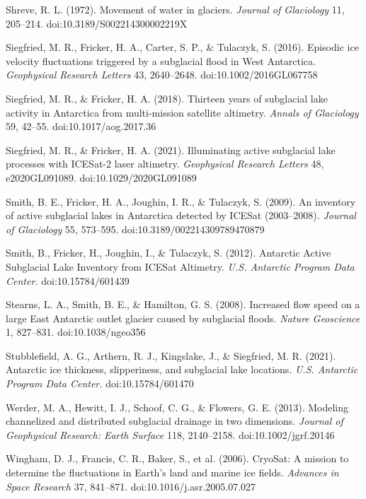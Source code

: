 \documentclass[tc, manuscript]{copernicus}
\begin{document}
\begin{thebibliography}{}
Shreve, R. L. (1972). Movement of water in glaciers. \emph{Journal of Glaciology} 11, 205–214. doi:10.3189/S002214300002219X

Siegfried, M. R., Fricker, H. A., Carter, S. P., \& Tulaczyk, S. (2016). Episodic ice velocity fluctuations triggered by a subglacial flood in West Antarctica. \emph{Geophysical Research Letters} 43, 2640–2648. doi:10.1002/2016GL067758

Siegfried, M. R., \& Fricker, H. A. (2018). Thirteen years of subglacial lake activity in Antarctica from multi-mission satellite altimetry. \emph{Annals of Glaciology} 59, 42–55. doi:10.1017/aog.2017.36

Siegfried, M. R., \& Fricker, H. A. (2021). Illuminating active subglacial lake processes with ICESat-2 laser altimetry. \emph{Geophysical Research Letters} 48, e2020GL091089. doi:10.1029/2020GL091089

Smith, B. E., Fricker, H. A., Joughin, I. R., \& Tulaczyk, S. (2009). An inventory of active subglacial lakes in Antarctica detected by ICESat (2003–2008). \emph{Journal of Glaciology} 55, 573–595. doi:10.3189/002214309789470879

Smith, B., Fricker, H., Joughin, I., \& Tulaczyk, S. (2012). Antarctic Active Subglacial Lake Inventory from ICESat Altimetry. \emph{U.S. Antarctic Program Data Center.} doi:10.15784/601439

Stearns, L. A., Smith, B. E., \& Hamilton, G. S. (2008). Increased flow speed on a large East Antarctic outlet glacier caused by subglacial floods. \emph{Nature Geoscience} 1, 827–831. doi:10.1038/ngeo356

Stubblefield, A. G., Arthern, R. J., Kingslake, J., \& Siegfried, M. R. (2021). Antarctic ice thickness, slipperiness, and subglacial lake locations. \emph{U.S. Antarctic Program Data Center.} doi:10.15784/601470

Werder, M. A., Hewitt, I. J., Schoof, C. G., \& Flowers, G. E. (2013). Modeling channelized and distributed subglacial drainage in two dimensions. \emph{Journal of Geophysical Research: Earth Surface} 118, 2140–2158. doi:10.1002/jgrf.20146

Wingham, D. J., Francis, C. R., Baker, S., et al. (2006). CryoSat: A mission to determine the fluctuations in Earth's land and marine ice fields. \emph{Advances in Space Research} 37, 841–871. doi:10.1016/j.asr.2005.07.027



\end{thebibliography}
\end{document}
